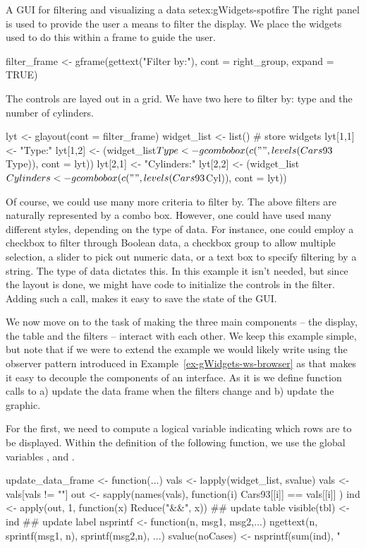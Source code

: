 \begin{example}{A GUI for filtering and visualizing a data set}{ex:gWidgets-spotfire}
The right panel is used to provide the user a means to filter the
display. We place the widgets used to do this within a frame to guide
the user.
\begin{Schunk}
\begin{Sinput}
 filter_frame <- gframe(gettext("Filter by:"), 
                        cont = right_group, expand = TRUE)
\end{Sinput}
\end{Schunk}
The controls are layed out in a grid. We have two here to filter by:
type and the number of cylinders.
\begin{Schunk}
\begin{Sinput}
 lyt <- glayout(cont = filter_frame)
 widget_list <- list() # store widgets
 lyt[1,1] <- "Type:"
 lyt[1,2] <- (widget_list$Type <- 
              gcombobox(c("", levels(Cars93$Type)), 
                        cont = lyt))
 lyt[2,1] <- "Cylinders:"
 lyt[2,2] <- (widget_list$Cylinders <- 
              gcombobox(c("", levels(Cars93$Cyl)), cont = lyt))
\end{Sinput}
\end{Schunk}
%
Of course, we could use many more criteria to filter by. The above
filters are naturally represented by a combo box. However, one could
have used many different styles, depending on the type of data. For
instance, one could employ a checkbox to filter through Boolean data,
a checkbox group to allow multiple selection, a slider to pick out
numeric data, or a text box to specify filtering by a string. The type
of data dictates this. In this example it isn't needed, but since the
layout is done, we might have code to initialize the controls in the
filter. Adding such a call, makes it easy to save the state of the GUI.

We now move on to the task of making the three main components -- the
display, the table and the filters -- interact with each other. We
keep this example simple, but note that if we were to extend the
example we would likely write using the observer pattern introduced in
Example~\ref{ex-gWidgets-ws-browser} as that makes it easy to decouple
the components of an interface. As it is we define function calls to
a) update the data frame when the filters change and b) update the
graphic.

For the first, we need to compute a logical variable indicating which
rows are to be displayed.  Within the definition of the following function, we
use the global variables ,  and .
\begin{Schunk}
\begin{Sinput}
 update_data_frame <- function(...) {
   vals <- lapply(widget_list, svalue)
   vals <- vals[vals != ""] 
   out <- sapply(names(vals), function(i) {
     Cars93[[i]] == vals[[i]]
   })
   ind <- apply(out, 1, function(x) Reduce("&&", x))
   ## update table
   visible(tbl) <- ind
   ## update label
   nsprintf <- function(n, msg1, msg2,...)
     ngettext(n, sprintf(msg1, n), sprintf(msg2,n), ...)
   svalue(noCases) <- nsprintf(sum(ind), "%
 }
\end{Sinput}
\end{Schunk}


\end{example}
